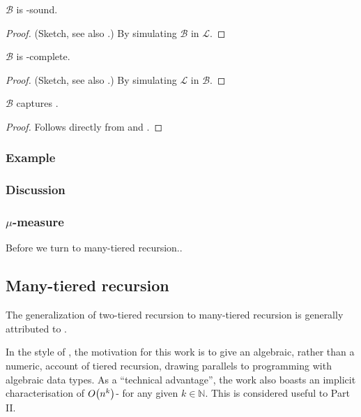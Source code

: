 \begin{lemma} \label{lem:b-fptime-sound} $\mathcal{B}$ is \FPTIME{}-sound.
\end{lemma}

\begin{proof} (Sketch, see also \cite{bellantoni-cook-1992}.) By simulating
$\mathcal{B}$ in $\mathcal{L}$.   \end{proof}

\begin{lemma} \label{lem:b-fptime-complete} $\mathcal{B}$ is
\FPTIME{}-complete.  \end{lemma}

\begin{proof} (Sketch, see also \cite{bellantoni-cook-1992}.) By simulating
$\mathcal{L}$ in $\mathcal{B}$.  \end{proof}

\begin{theorem} $\mathcal{B}$ captures \FPTIME{}. \end{theorem}

\begin{proof} Follows directly from  and
. \end{proof}

\subsubsection{Example}

\subsubsection{Discussion}

\subsubsection{$\mu$-measure}

Before we turn to many-tiered recursion..

\subsection{Many-tiered recursion}

The generalization of two-tiered recursion to many-tiered recursion is
generally attributed to \cite{leivant-1995}.

In the style of \cite{leivant-1990}, the motivation for this work is to give an
algebraic, rather than a numeric, account of tiered recursion, drawing
parallels to programming with algebraic data types. As a ``technical
advantage'', the work also boasts an implicit characterisation of
$O{\mathopen{}\left({n^k}\right)\mathclose{}}$-\TIME{} for any given $k\in \mathbb{N}$. This is considered useful
to Part II.

